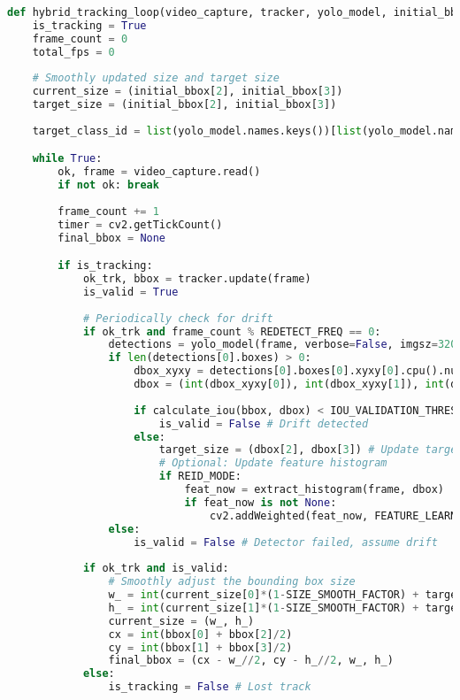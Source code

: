 \documentclass[12pt, a4paper]{article}
\begin{document}
\begin{lstlisting}[language=Python, caption={The advanced hybrid tracking loop with re-detection.}, label={lst:hybrid_loop}]
def hybrid_tracking_loop(video_capture, tracker, yolo_model, initial_bbox, initial_hist):
    is_tracking = True
    frame_count = 0
    total_fps = 0
    
    # Smoothly updated size and target size
    current_size = (initial_bbox[2], initial_bbox[3])
    target_size = (initial_bbox[2], initial_bbox[3])
    
    target_class_id = list(yolo_model.names.keys())[list(yolo_model.names.values()).index(TARGET_CLASS.lower())]

    while True:
        ok, frame = video_capture.read()
        if not ok: break
        
        frame_count += 1
        timer = cv2.getTickCount()
        final_bbox = None

        if is_tracking:
            ok_trk, bbox = tracker.update(frame)
            is_valid = True
            
            # Periodically check for drift
            if ok_trk and frame_count % REDETECT_FREQ == 0:
                detections = yolo_model(frame, verbose=False, imgsz=320, conf=DETECT_CONF_THRESH, classes=[target_class_id])
                if len(detections[0].boxes) > 0:
                    dbox_xyxy = detections[0].boxes[0].xyxy[0].cpu().numpy()
                    dbox = (int(dbox_xyxy[0]), int(dbox_xyxy[1]), int(dbox_xyxy[2]-dbox_xyxy[0]), int(dbox_xyxy[3]-dbox_xyxy[1]))
                    
                    if calculate_iou(bbox, dbox) < IOU_VALIDATION_THRESH:
                        is_valid = False # Drift detected
                    else:
                        target_size = (dbox[2], dbox[3]) # Update target size
                        # Optional: Update feature histogram
                        if REID_MODE:
                            feat_now = extract_histogram(frame, dbox)
                            if feat_now is not None:
                                cv2.addWeighted(feat_now, FEATURE_LEARNING_RATE, initial_hist, 1 - FEATURE_LEARNING_RATE, 0, initial_hist)
                else:
                    is_valid = False # Detector failed, assume drift
            
            if ok_trk and is_valid:
                # Smoothly adjust the bounding box size
                w_ = int(current_size[0]*(1-SIZE_SMOOTH_FACTOR) + target_size[0]*SIZE_SMOOTH_FACTOR)
                h_ = int(current_size[1]*(1-SIZE_SMOOTH_FACTOR) + target_size[1]*SIZE_SMOOTH_FACTOR)
                current_size = (w_, h_)
                cx = int(bbox[0] + bbox[2]/2)
                cy = int(bbox[1] + bbox[3]/2)
                final_bbox = (cx - w_//2, cy - h_//2, w_, h_)
            else:
                is_tracking = False # Lost track


\end{lstlisting}
\end{document}
